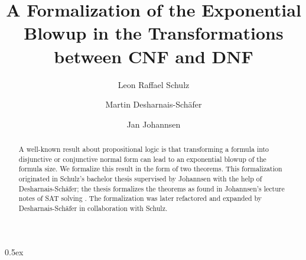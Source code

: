 \documentclass[11pt,a4paper]{article}
\begin{document}
\title{A Formalization of the Exponential Blowup in the Transformations between CNF and DNF}
\author{Leon Raffael Schulz \and Martin Desharnais-Schäfer \and Jan Johannsen}
\maketitle

\begin{abstract}
  A well-known result about propositional logic is that transforming a formula into disjunctive or conjunctive normal form can lead to an exponential blowup of the formula size.
  We formalize this result in the form of two theorems.
  This formalization originated in Schulz’s bachelor thesis \cite{Schulz_bsc_thesis} supervised by Johannsen with the help of Desharnais-Schäfer;
  the thesis formalizes the theorems as found in Johannsen's lecture notes of SAT solving \cite{Johannsen_skript}.
  The formalization was later refactored and expanded by Desharnais-Schäfer in collaboration with Schulz.
\end{abstract}

\tableofcontents

\parindent 0pt\parskip 0.5ex



%

\end{document}
